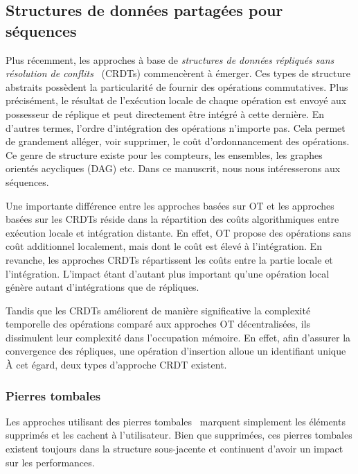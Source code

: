\subsection{Structures de données partagées pour séquences}

Plus récemment, les approches à base de \emph{structures de données répliqués
  sans résolution de conflits}~\cite{shapiro2011comprehensive,
  shapiro2011conflict} (CRDTs) commencèrent à émerger. Ces types de structure
abstraits possèdent la particularité de fournir des opérations commutatives.
Plus précisément, le résultat de l'exécution locale de chaque opération est
envoyé aux possesseur de réplique et peut directement être intégré à cette
dernière.  En d'autres termes, l'ordre d'intégration des opérations n'importe
pas. Cela permet de grandement alléger, voir supprimer, le coût d'ordonnancement
des opérations. Ce genre de structure existe pour les compteurs, les ensembles,
les graphes orientés acycliques (DAG) etc. Dans ce manuscrit, nous nous
intéresserons aux séquences.

Une importante différence entre les approches basées sur OT et les approches
basées sur les CRDTs réside dans la répartition des coûts algorithmiques entre
exécution locale et intégration distante. En effet, OT propose des opérations
sans coût additionnel localement, mais dont le coût est élevé à l'intégration.
En revanche, les approches CRDTs répartissent les coûts entre la partie locale
et l'intégration.  L'impact étant d'autant plus important qu'une opération local
génère autant d'intégrations que de répliques.

Tandis que les CRDTs améliorent de manière significative la complexité
temporelle des opérations comparé aux approches OT décentralisées, ils
dissimulent leur complexité dans l'occupation mémoire. En effet, afin d'assurer
la convergence des répliques, une opération d'insertion alloue un identifiant
unique  À cet égard, deux types d'approche CRDT existent.

\subsubsection{Pierres tombales}

Les approches utilisant des pierres tombales~\cite{ahmed2011evaluating,
  conway2014language, grishchenko2010deep, oster2006data,
  preguica2009commutative, roh2011replicated, weiss2007wooki, wu2010partial,
  Yu2012stringwise} marquent simplement les éléments supprimés et les cachent à
l'utilisateur. Bien que supprimées, ces pierres tombales existent toujours dans
la structure sous-jacente et continuent d'avoir un impact sur les performances.


